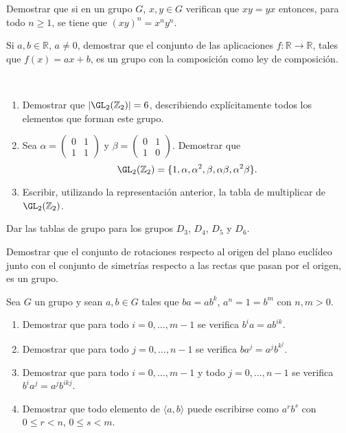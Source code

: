 \begin{ejercicio}\label{ej:2.8}
    Demostrar que si en un grupo $G$, $x, y \in G$ verifican que $xy = yx$ entonces, para todo $n \geq 1$, se tiene que $(xy)^n = x^ny^n$.
\end{ejercicio}

\begin{ejercicio}\label{ej:2.9}
    Si $a, b \in \mathbb{R}$, $a \neq 0$, demostrar que el conjunto de las aplicaciones $f : \mathbb{R} \to \mathbb{R}$, tales que $f(x) = ax + b$, es un grupo con la composición como ley de composición.
\end{ejercicio}

\begin{ejercicio}\label{ej:2.10}~
    \begin{enumerate}
        \item Demostrar que $|\GL_2(\mathbb{Z}_2)| = 6$, describiendo explícitamente todos los elementos que forman este grupo.
        \item Sea $\alpha = \begin{pmatrix} 0 & 1 \\ 1 & 1 \end{pmatrix}$ y $\beta = \begin{pmatrix} 0 & 1 \\ 1 & 0 \end{pmatrix}$. Demostrar que
        $$\GL_2(\mathbb{Z}_2) = \{1, \alpha, \alpha^2, \beta, \alpha\beta, \alpha^2\beta\}.$$
        \item Escribir, utilizando la representación anterior, la tabla de multiplicar de $\GL_2(\mathbb{Z}_2)$.
    \end{enumerate}
\end{ejercicio}

\begin{ejercicio}\label{ej:2.11}
    Dar las tablas de grupo para los grupos $D_3$, $D_4$, $D_5$ y $D_6$.
\end{ejercicio}

\begin{ejercicio}\label{ej:2.12}
    Demostrar que el conjunto de rotaciones respecto al origen del plano euclídeo junto con el conjunto de simetrías respecto a las rectas que pasan por el origen, es un grupo.
\end{ejercicio}

\begin{ejercicio}\label{ej:2.13}
    Sea $G$ un grupo y sean $a, b \in G$ tales que $ba = ab^k$, $a^n = 1 = b^m$ con $n, m > 0$.
    \begin{enumerate}
        \item Demostrar que para todo $i = 0, \ldots, m - 1$ se verifica $b^ia = ab^{ik}$.
        \item Demostrar que para todo $j = 0, \ldots, n - 1$ se verifica $ba^j = a^jb^{k^j}$.
        \item Demostrar que para todo $i = 0, \ldots, m - 1$ y todo $j = 0, \ldots, n - 1$ se verifica $b^ia^j = a^jb^{ikj}$.
        \item Demostrar que todo elemento de $\langle a, b \rangle$ puede escribirse como $a^rb^s$ con $0 \leq r < n$, $0 \leq s < m$.
    \end{enumerate}
\end{ejercicio}


